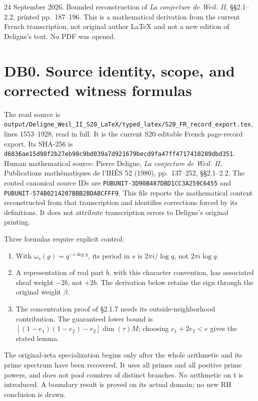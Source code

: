 \documentclass[
]{report}
\providecommand{\tightlist}{%
  \setlength{\itemsep}{0pt}\setlength{\parskip}{0pt}}
\begin{document}
24 September 2026. Bounded reconstruction of \emph{La conjecture de
Weil. II}, §§2.1--2.2, printed pp.~187--196. This is a mathematical
derivation from the current French transcription, not original author
LaTeX and not a new edition of Deligne's text. No PDF was opened.

\section{DB0. Source identity, scope, and corrected witness
formulas}\label{db0.-source-identity-scope-and-corrected-witness-formulas}

The read source is
\nolinkurl{output/Deligne_Weil_II_S20_LaTeX/typed_latex/S20_FR_record_export.tex},
lines 1553--1928, read in full. It is the current S20 editable French
page-record export. Its SHA-256 is
\nolinkurl{d6836ae15d98f2b27eb98c9bd039a7d921679becd9fa47ff4717410289dbd351}.
Human mathematical source: Pierre Deligne, \emph{La conjecture de Weil.
II}, Publications mathématiques de l'IHÉS 52 (1980), pp.~137--252,
§§2.1--2.2. The routed canonical source IDs are
\nolinkurl{PUBUNIT-3D90B487DBD1CC3A259C6455} and
\nolinkurl{PUBUNIT-574B0214207BBB2BDABCFFF9}. This file reports the
mathematical content reconstructed from that transcription and
identifies corrections forced by its definitions. It does not attribute
transcription errors to Deligne's original printing.

Three formulas require explicit control:

\begin{enumerate}
\def\labelenumi{\arabic{enumi}.}
\tightlist
\item
  With \(\omega_s(g)=q^{-s\deg g}\), its period in \(s\) is
  \(2\pi i/\log q\), not \(2\pi i\log q\).
\item
  A representation of real part \(b\), with this character convention,
  has associated sheaf weight \(-2b\), not \(+2b\). The derivation below
  retains the sign through the original weight \(\beta\).
\item
  The concentration proof of §2.1.7 needs its outside-neighborhood
  contribution. The guaranteed lower bound is
  \([(1-e_1)(1-e_2)-e_2]\dim(\tau)M\); choosing \(e_1+2e_2<e\) gives the
  stated lemma.
\end{enumerate}

The original-zeta specialization begins only after the whole arithmetic
and its prime spectrum have been recovered. It uses all primes and all
positive prime powers, and does not pool counters of distinct branches.
No arithmetic on τ is introduced. A boundary result is proved on its
actual domain; no new RH conclusion is drawn.
\end{document}
